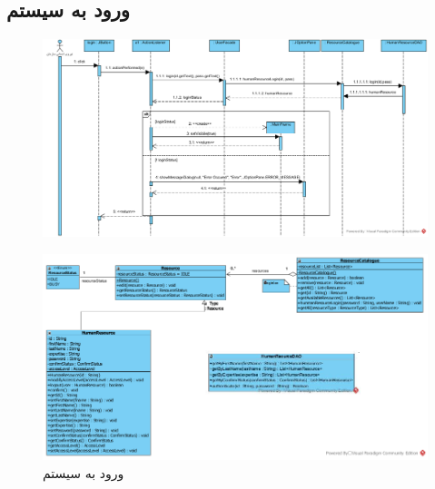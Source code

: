 \begin{landscape}
\newpage
\section{ورود به سیستم}
\begin{figure}[H]
	\centering
	\includegraphics[scale=0.65]{img/sequence-design/SignIn}
\end{figure}
\begin{figure}[H]
	\centering
	\includegraphics[scale=0.6]{img/sequence-design/SignInCD}
	\caption{ورود به سیستم}
\end{figure}
\end{landscape}